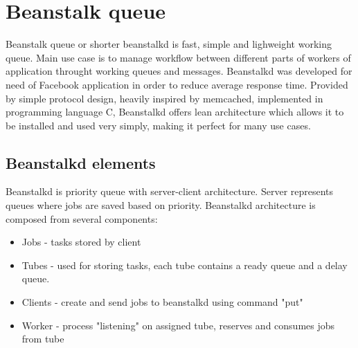\section{Beanstalk queue}

    Beanstalk queue or shorter beanstalkd is fast, simple and lighweight working queue\cite{}. Main use case is to manage workflow between different parts of workers of application throught working queues and messages. Beanstalkd was developed for need of Facebook application in order to reduce average response time\cite{beanstalkdOfficial}. Provided by simple protocol design, heavily inspired by memcached, implemented in programming language C, Beanstalkd offers lean architecture which allows it to be installed and used very simply, making it perfect for many use cases\cite{beanstalkdInstall}.


    \subsection{Beanstalkd elements}
    Beanstalkd is priority queue with server-client architecture. Server represents queues where jobs are saved based on priority. Beanstalkd architecture is composed from several components:
    \begin{itemize}
        \item Jobs - tasks stored by client
        \item Tubes - used for storing tasks, each tube contains a ready queue and a delay queue.
        \item Clients - create and send jobs to beanstalkd using command "put"
        \item Worker - process "listening" on assigned tube, reserves and consumes jobs from tube
    \end{itemize}

